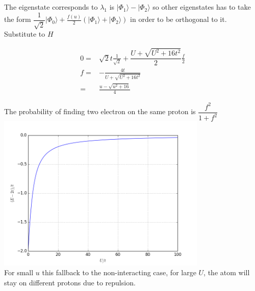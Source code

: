 \documentclass[10pt,fleqn]{article}
\newcommand{\eqar}[1]
{
  \begin{align*}
    #1
  \end{align*}
}
\newcommand{\paren}[1]{{\left({#1}\right)}}
\begin{document}
\subsection{}
The eigenstate corresponds to $\lambda_1$ is $|\Phi_1\rangle-|\Phi_2\rangle$
so other eigenstates has to take the form $\dfrac{1}{\sqrt2}|\Phi_0\rangle+\frac{f(u)}{2}\paren{|\Phi_1\rangle+|\Phi_2\rangle}$ in order to be orthogonal to it.
Substitute to $H$
\eqar{
  0=&\sqrt2t\frac{1}{\sqrt{2}}+\dfrac{U+\sqrt{U^2+16t^2}}{2}\frac{f}{2}\\
  f=&-\frac{4t}{U+\sqrt{U^2+16t^2}}\\
  =&\frac{u-\sqrt{u^2+16}}{4}
}
The probability of finding two electron on the same proton is $\dfrac{f^2}{1+f^2}$\\
\includegraphics[width=10cm]{4c.png}\\
For small $u$ this fallback to the non-interacting case, for large $U$, the atom will stay on different protons due to repulsion.
\end{document}

